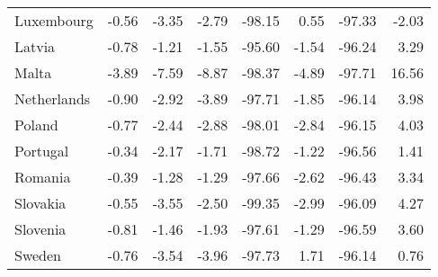\begin{longtable}{lrrrrrrr}
  Luxembourg & -0.56 & -3.35 & -2.79 & -98.15 & 0.55 & -97.33 & -2.03 \\ 
  Latvia & -0.78 & -1.21 & -1.55 & -95.60 & -1.54 & -96.24 & 3.29 \\ 
  Malta & -3.89 & -7.59 & -8.87 & -98.37 & -4.89 & -97.71 & 16.56 \\ 
  Netherlands & -0.90 & -2.92 & -3.89 & -97.71 & -1.85 & -96.14 & 3.98 \\ 
  Poland & -0.77 & -2.44 & -2.88 & -98.01 & -2.84 & -96.15 & 4.03 \\ 
  Portugal & -0.34 & -2.17 & -1.71 & -98.72 & -1.22 & -96.56 & 1.41 \\ 
  Romania & -0.39 & -1.28 & -1.29 & -97.66 & -2.62 & -96.43 & 3.34 \\ 
  Slovakia & -0.55 & -3.55 & -2.50 & -99.35 & -2.99 & -96.09 & 4.27 \\ 
  Slovenia & -0.81 & -1.46 & -1.93 & -97.61 & -1.29 & -96.59 & 3.60 \\ 
  Sweden & -0.76 & -3.54 & -3.96 & -97.73 & 1.71 & -96.14 & 0.76 \\ 
   \hline
\hline
\end{longtable}
